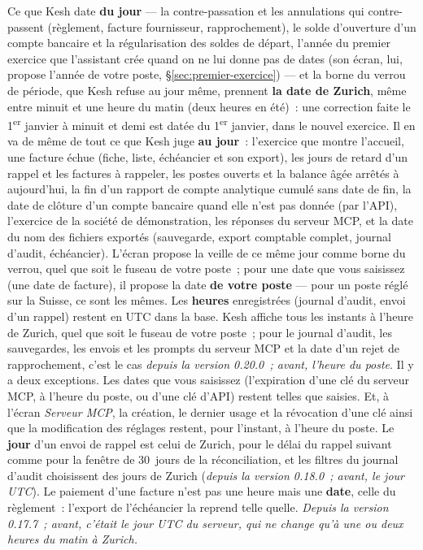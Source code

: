 \documentclass[a4paper,11pt,oneside]{article}
\begin{document}
\begin{keshnote}[title={La date du jour est celle de Zurich, même la nuit}]\label{sec:date-du-jour}
Ce que Kesh date \textbf{du jour} --- la contre-passation et les annulations qui contre-passent
(règlement, facture fournisseur, rapprochement), le solde d'ouverture d'un compte bancaire et
la régularisation des soldes de départ, l'année du premier exercice que l'assistant crée quand
on ne lui donne pas de dates (son écran, lui, propose l'année de votre poste, \S\ref{sec:premier-exercice}) --- et la borne du verrou de période, que Kesh refuse au jour même, prennent \textbf{la
date de Zurich}, même entre minuit et une heure du matin (deux heures en été)~: une correction
faite le 1\textsuperscript{er} janvier à minuit et demi est datée du 1\textsuperscript{er}
janvier, dans le nouvel exercice. Il en va de même de tout ce que Kesh juge \textbf{au jour}~:
l'exercice que montre l'accueil, une facture échue (fiche, liste, échéancier et son export), les
jours de retard d'un rappel et les factures à rappeler, les postes ouverts et la balance âgée
arrêtés à aujourd'hui, la fin d'un rapport de compte analytique cumulé sans date de fin, la date de clôture
d'un compte bancaire quand elle n'est pas donnée (par l'API), l'exercice de la société de
démonstration, les réponses du serveur MCP, et la date du nom des fichiers exportés
(sauvegarde, export comptable complet, journal d'audit, échéancier). L'écran propose la veille
de ce même jour comme borne du verrou, quel que soit le fuseau de votre poste~; pour une date que
vous saisissez (une date de facture), il propose la date \textbf{de votre poste} --- pour un
poste réglé sur la Suisse, ce sont les mêmes. Les \textbf{heures} enregistrées (journal d'audit,
envoi d'un rappel) restent en UTC dans la base. Kesh affiche tous les instants à l'heure de Zurich, quel
que soit le fuseau de votre poste~; pour le journal d'audit, les sauvegardes, les envois et les prompts du
serveur MCP et la date d'un rejet de rapprochement, c'est le cas \emph{depuis la version 0.20.0~; avant,
l'heure du poste}. Il y a deux exceptions. Les dates que vous saisissez (l'expiration d'une clé du
serveur MCP, à l'heure du poste, ou d'une clé d'API) restent telles que saisies. Et, à l'écran
\emph{Serveur MCP}, la création, le dernier usage et la révocation d'une clé ainsi que la modification
des réglages restent, pour l'instant, à l'heure du poste. Le \textbf{jour} d'un envoi de rappel est celui de Zurich, pour
le délai du rappel suivant comme pour la fenêtre de 30~jours de la réconciliation, et les filtres
du journal d'audit choisissent des jours de Zurich (\emph{depuis la version 0.18.0~; avant, le
jour UTC}). Le paiement d'une facture n'est pas une heure mais une
\textbf{date}, celle du règlement~: l'export de l'échéancier la reprend telle quelle.
\emph{Depuis la version 0.17.7~; avant, c'était le jour UTC du serveur, qui ne change
qu'à une ou deux heures du matin à Zurich.}
\end{keshnote}
\end{document}
